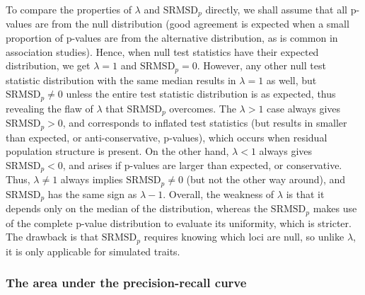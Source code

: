 \documentclass[11pt]{article}
\newcommand{\rmsd}{\text{SRMSD}_p}
\begin{document}
To compare the properties of $\lambda$ and $\rmsd$ directly, we shall assume that all p-values are from the null distribution (good agreement is expected when a small proportion of p-values are from the alternative distribution, as is common in association studies).
Hence, when null test statistics have their expected distribution, we get $\lambda = 1$ and $\rmsd = 0$.
However, any other null test statistic distribution with the same median results in $\lambda = 1$ as well, but $\rmsd \ne 0$ unless the entire test statistic distribution is as expected, thus revealing the flaw of $\lambda$ that $\rmsd$ overcomes.
The $\lambda > 1$ case always gives $\rmsd > 0$, and corresponds to inflated test statistics (but results in smaller than expected, or anti-conservative, p-values), which occurs when residual population structure is present.
On the other hand, $\lambda < 1$ always gives $\rmsd < 0$, and arises if p-values are larger than expected, or conservative.
Thus, $\lambda \ne 1$ always implies $\rmsd \ne 0$ (but not the other way around), and $\rmsd$ has the same sign as $\lambda - 1$.
Overall, the weakness of $\lambda$ is that it depends only on the median of the distribution, whereas the $\rmsd$ makes use of the complete p-value distribution to evaluate its uniformity, which is stricter.
The drawback is that $\rmsd$ requires knowing which loci are null, so unlike $\lambda$, it is only applicable for simulated traits.

\subsubsection{The area under the precision-recall curve}
\end{document}
